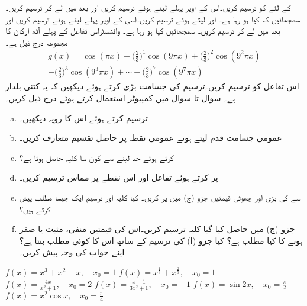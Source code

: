 
 کے لئے  کو ترسیم کریں۔اس کے اوپر پہلے  لیتے ہوئے  ترسیم کریں اور بعد میں  لے کر ترسیم کریں۔سمجھائیں کہ کیا ہو رہا ہے۔
 اور  لیتے ہوئے  ترسیم کریں۔اسی کے اوپر پہلے  لیتے ہوئے  ترسیم کریں اور بعد میں  لے کر ترسیم کریں۔ سمجھائیں کیا ہو رہا ہے۔ 
وائشسٹراس تفاعل  کے پہلے آٹھ ارکان کا مجموعہ درج ذیل ہے۔
\begin{multline*}
g(x)=\cos (\pi x)+\big(\frac{2}{3}\big)^1\cos (9\pi x)+\big(\frac{2}{3}\big)^2\cos (9^2\pi x)\\
+\big(\frac{2}{3}\big)^3\cos (9^3\pi x)+\cdots+\big(\frac{2}{3}\big)^7\cos (9^7\pi x)
\end{multline*}
اس تفاعل کو ترسیم کریں۔ترسیم کی جسامت بڑی کرتے ہوئے دیکھیں کہ یہ کتنی بلدار ہے۔
سوال  تا سوال  میں کمپیوٹر استعمال کرتے ہوئے درج ذیل کریں۔
\begin{enumerate}[a.]

\item
{} ترسیم کرتے ہوئے اس کا رویہ دیکھیں۔
\item
عمومی جسامت قدم  لیتے ہوئے عمومی نقطہ   پر حاصل تقسیم   متعارف کریں۔
\item
{} کرتے ہوئے حد لینے سے کون سا کلیہ حاصل ہوتا ہے؟
\item
{} پر کرتے ہوئے تفاعل اور اس نقطے پر مماس ترسیم کریں۔
\item
{} سے  کی بڑی اور چھوٹی قیمتیں جزو (ج) میں پر کریں۔ کیا کلیہ اور ترسیم ایک جیسا مطلب پیش کرتے ہیں؟
\item
جزو (ج) میں حاصل کیا گیا کلیہ ترسیم کریں۔اس کی قیمتیں منفی، مثبت یا صفر ہونے کا کیا مطلب ہے؟ کیا جزو (ا) کی ترسیم کے ساتھ اس کا کوئی مطلب بنتا ہے؟ اپنے جواب کی وجہ پیش کریں۔
\end{enumerate}

$f(x)=x^3+x^2-x,\quad x_0=1$
$f(x)=x^{\tfrac{1}{3}}+x^{\tfrac{2}{3}},\quad x_0=1$
$f(x)=\tfrac{4x}{x^2+1},\quad x_0=2$
$f(x)=\tfrac{x-1}{3x^2+1},\quad x_0=-1$
$f(x)=\sin 2x,\quad x_0=\tfrac{\pi}{2}$
$f(x)=x^2\cos x,\quad x_0=\tfrac{\pi}{4}$

